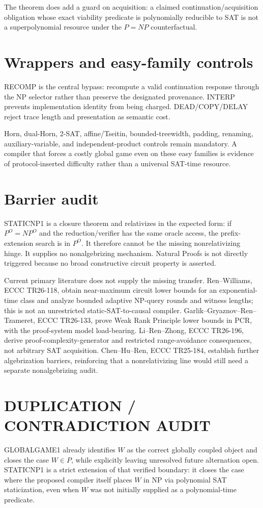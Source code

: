 \documentclass[11pt]{article}
\begin{document}
The theorem does add a guard on acquisition: a claimed continuation/acquisition obligation whose exact viability predicate is polynomially reducible to SAT is not a superpolynomial resource under the \(P=NP\) counterfactual.

\section*{Wrappers and easy-family controls}
RECOMP is the central bypass: recompute a valid continuation response through the NP selector rather than preserve the designated provenance. INTERP prevents implementation identity from being charged. DEAD/COPY/DELAY reject trace length and presentation as semantic cost.

Horn, dual-Horn, 2-SAT, affine/Tseitin, bounded-treewidth, padding, renaming, auxiliary-variable, and independent-product controls remain mandatory. A compiler that forces a costly global game even on these easy families is evidence of protocol-inserted difficulty rather than a universal SAT-time resource.

\section*{Barrier audit}
STATICNP1 is a closure theorem and relativizes in the expected form: if \(P^O=NP^O\) and the reduction/verifier has the same oracle access, the prefix-extension search is in \(P^O\). It therefore cannot be the missing nonrelativizing hinge. It supplies no nonalgebrizing mechanism. Natural Proofs is not directly triggered because no broad constructive circuit property is asserted.

Current primary literature does not supply the missing transfer. Ren--Williams, ECCC TR26-118, obtain near-maximum circuit lower bounds for an exponential-time class and analyze bounded adaptive NP-query rounds and witness lengths; this is not an unrestricted static-SAT-to-causal compiler. Garlik--Gryaznov--Ren--Tzameret, ECCC TR26-133, prove Weak Rank Principle lower bounds in PCR, with the proof-system model load-bearing. Li--Ren--Zhong, ECCC TR26-196, derive proof-complexity-generator and restricted range-avoidance consequences, not arbitrary SAT acquisition. Chen--Hu--Ren, ECCC TR25-184, establish further algebrization barriers, reinforcing that a nonrelativizing line would still need a separate nonalgebrizing audit.

\section*{DUPLICATION / CONTRADICTION AUDIT}
GLOBALGAME1 already identifies \(W\) as the correct globally coupled object and closes the case \(W\in P\), while explicitly leaving unresolved future alternation open. STATICNP1 is a strict extension of that verified boundary: it closes the case where the proposed compiler itself places \(W\) in NP via polynomial SAT staticization, even when \(W\) was not initially supplied as a polynomial-time predicate.
\end{document}
